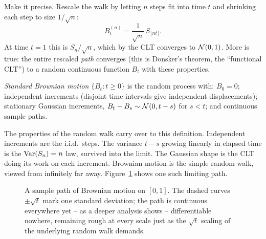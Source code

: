Make it precise. Rescale the walk by letting $n$ steps fit into time $t$ and
shrinking each step to size $1/\sqrt{n}$:
\[
  B_t^{(n)} = \frac{1}{\sqrt{n}}\, S_{\lfloor nt \rfloor}.
\]
At time $t = 1$ this is $S_n/\sqrt{n}$, which by the CLT converges to
$\mathcal{N}(0, 1)$. More is true: the entire rescaled \emph{path} converges (this
is Donsker's theorem, the ``functional CLT'') to a random continuous function
$B_t$ with these properties.

\begin{definition}
\label{ch26:def-brownian}
\emph{Standard Brownian motion} $\{B_t : t \ge 0\}$ is the random process with:
$B_0 = 0$; independent increments (disjoint time intervals give independent
displacements); stationary Gaussian increments, $B_t - B_s \sim \mathcal{N}(0,
t-s)$ for $s < t$; and continuous sample paths.
\end{definition}

The properties of the random walk carry over to this definition.
Independent increments are the i.i.d.\ steps. The variance $t - s$ growing
linearly in elapsed time is the $\operatorname{Var}(S_n) = n$ law, survived into the limit.
The Gaussian shape is the CLT doing its work on each increment. Brownian
motion is the simple random walk, viewed from infinitely far away.
Figure~\ref{ch26:fig-brownian} shows one such limiting path.

\begin{figure}[H]
\centering
{}
\caption{A sample path of Brownian motion on $[0,1]$. The dashed curves
$\pm\sqrt{t}$ mark one standard deviation; the path is continuous everywhere
yet -- as a deeper analysis shows -- differentiable nowhere, remaining rough at
every scale just as the $\sqrt{t}$ scaling of the underlying random walk
demands.}
\label{ch26:fig-brownian}
\end{figure}

